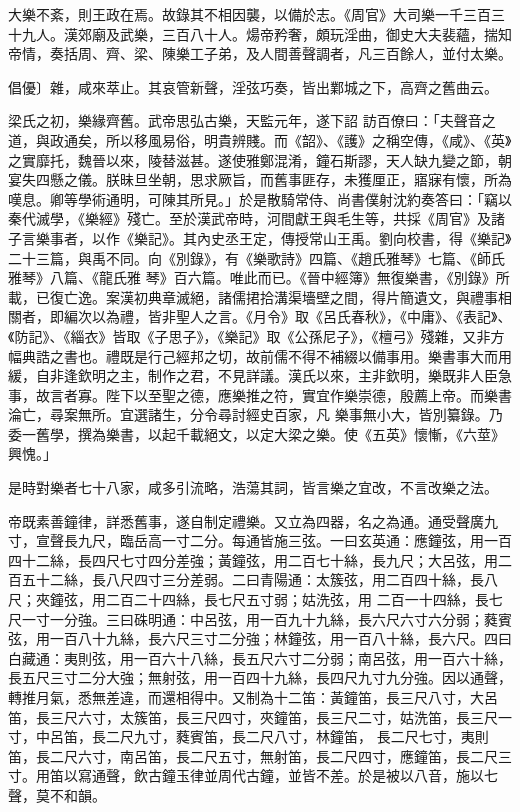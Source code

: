 \begin{pinyinscope}
 大樂不紊，則王政在焉。故錄其不相因襲，以備於志。《周官》大司樂一千三百三十九人。漢郊廟及武樂，三百八十人。煬帝矜奢，頗玩淫曲，御史大夫裴蘊，揣知帝情，奏括周、齊、梁、陳樂工子弟，及人間善聲調者，凡三百餘人，並付太樂。



 倡優〕雜，咸來萃止。其哀管新聲，淫弦巧奏，皆出鄴城之下，高齊之舊曲云。



 梁氏之初，樂緣齊舊。武帝思弘古樂，天監元年，遂下詔
 訪百僚曰：「夫聲音之道，與政通矣，所以移風易俗，明貴辨賤。而《韶》、《護》之稱空傳，《咸》、《英》之實靡托，魏晉以來，陵替滋甚。遂使雅鄭混淆，鐘石斯謬，天人缺九變之節，朝宴失四懸之儀。朕昧旦坐朝，思求厥旨，而舊事匪存，未獲厘正，寤寐有懷，所為嘆息。卿等學術通明，可陳其所見。」於是散騎常侍、尚書僕射沈約奏答曰：「竊以秦代滅學，《樂經》殘亡。至於漢武帝時，河間獻王與毛生等，共採《周官》及諸子言樂事者，以作《樂記》。其內史丞王定，傳授常山王禹。劉向校書，得《樂記》二十三篇，與禹不同。向《別錄》，有《樂歌詩》四篇、《趙氏雅琴》七篇、《師氏雅琴》八篇、《龍氏雅
 琴》百六篇。唯此而已。《晉中經簿》無復樂書，《別錄》所載，已復亡逸。案漢初典章滅絕，諸儒捃拾溝渠墻壁之間，得片簡遺文，與禮事相關者，即編次以為禮，皆非聖人之言。《月令》取《呂氏春秋》，《中庸》、《表記》、《防記》、《緇衣》皆取《子思子》，《樂記》取《公孫尼子》，《檀弓》殘雜，又非方幅典誥之書也。禮既是行己經邦之切，故前儒不得不補綴以備事用。樂書事大而用緩，自非逢欽明之主，制作之君，不見詳議。漢氏以來，主非欽明，樂既非人臣急事，故言者寡。陛下以至聖之德，應樂推之符，實宜作樂崇德，殷薦上帝。而樂書淪亡，尋案無所。宜選諸生，分令尋討經史百家，凡
 樂事無小大，皆別纂錄。乃委一舊學，撰為樂書，以起千載絕文，以定大梁之樂。使《五英》懷慚，《六莖》興愧。」



 是時對樂者七十八家，咸多引流略，浩蕩其詞，皆言樂之宜改，不言改樂之法。



 帝既素善鐘律，詳悉舊事，遂自制定禮樂。又立為四器，名之為通。通受聲廣九寸，宣聲長九尺，臨岳高一寸二分。每通皆施三弦。一曰玄英通：應鐘弦，用一百四十二絲，長四尺七寸四分差強；黃鐘弦，用二百七十絲，長九尺；大呂弦，用二百五十二絲，長八尺四寸三分差弱。二曰青陽通：太簇弦，用二百四十絲，長八尺；夾鐘弦，用二百二十四絲，長七尺五寸弱；姑洗弦，用
 二百一十四絲，長七尺一寸一分強。三曰硃明通：中呂弦，用一百九十九絲，長六尺六寸六分弱；蕤賓弦，用一百八十九絲，長六尺三寸二分強；林鐘弦，用一百八十絲，長六尺。四曰白藏通：夷則弦，用一百六十八絲，長五尺六寸二分弱；南呂弦，用一百六十絲，長五尺三寸二分大強；無射弦，用一百四十九絲，長四尺九寸九分強。因以通聲，轉推月氣，悉無差違，而還相得中。又制為十二笛：黃鐘笛，長三尺八寸，大呂笛，長三尺六寸，太簇笛，長三尺四寸，夾鐘笛，長三尺二寸，姑洗笛，長三尺一寸，中呂笛，長二尺九寸，蕤賓笛，長二尺八寸，林鐘笛，
 長二尺七寸，夷則笛，長二尺六寸，南呂笛，長二尺五寸，無射笛，長二尺四寸，應鐘笛，長二尺三寸。用笛以寫通聲，飲古鐘玉律並周代古鐘，並皆不差。於是被以八音，施以七聲，莫不和韻。




\end{pinyinscope}
